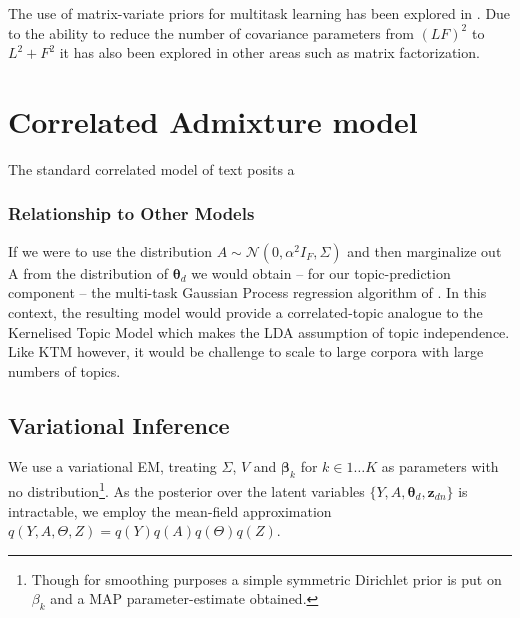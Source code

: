 \documentclass[10pt,fleqn]{article}
\newcommand \vv[1] { \bm #1 }
\newcommand \Ed {{ \vv{\xi}_d}}
\newcommand \Axi { { \Lambda_{\xi} } }
\newcommand \bxi { { \vv{b}_{\xi} } }
\newcommand \cxi { { c_{\xi} } }
\newcommand \zdn[0]  { { \vv{z}_{dn} } }
\newcommand \thd[0]  { { \vv \theta_d } }
\newcommand \mnor[3]  { \mathcal{N} \left(#1, #2, #3\right) }
\newcommand \beta[1]  { \mathcal{B}eta \left( {#1}, {#2} \right) }
\newcommand \md   { \vv{m}_d }
\newcommand \one  {{  \mathds{1} }}
\newcommand \lse { \text{lse} }
\begin{document}
The use of matrix-variate priors for multitask learning has been explored in \cite{Stegle2011}\cite{Bonilla2008} \cite{Archambeau2011}\cite{Yang2011}. Due to the ability to reduce the number of covariance parameters from $(LF)^2$ to $L^2 + F^2$ it has also been explored in other areas such as matrix factorization\cite{Allen2010}.

\section{Correlated Admixture model}
The standard correlated model of text posits a

\subsubsection*{Relationship to Other Models}
If we were to use the distribution $A \sim \mnor{0}{\alpha^2 I_F}{\Sigma}$ and then marginalize out A from the distribution of $\thd$ we would obtain -- for our topic-prediction component -- the multi-task Gaussian Process regression algorithm of \cite{Bonilla2008}. In this context, the resulting model would provide a correlated-topic analogue to the Kernelised Topic Model \cite{Hennig2012} which makes the LDA assumption of topic independence. Like KTM however, it would be challenge to scale to large corpora with large numbers of topics.

\subsection{Variational Inference}
\newcommand \onek { \one_K }
\newcommand \md { \vv{m}_d }
\newcommand \Vd { V^{(d)} }


\newcommand \sigmoid[1] { {  \vv{\sigma}\left( #1 \right)  } }
\newcommand \sigmoidk[1] { {  \sigmoidat{#1}{k}  } }
\newcommand \sigmoidat[2] { {  \sigma_{#2}\left( #1 \right)  } }
\newcommand \ged { { \nabla_{\Ed} } }
\newcommand \gesig { { \ged \left[ \sigmoid{\Ed} \right] } }

We use a variational EM, treating $\Sigma$, $V$ and $\vv{\beta}_k$ for $k \in 1\ldots K$ as parameters with no distribution\footnote{Though for smoothing purposes a simple symmetric Dirichlet prior is put on $\beta_k$ and a MAP parameter-estimate obtained.}. As the posterior over the latent variables $\{Y, A, \thd, \zdn\}$ is intractable, we employ the mean-field approximation $q(Y, A, \Theta, Z) = q(Y)q(A)q(\Theta)q(Z)$. 
\end{document}
